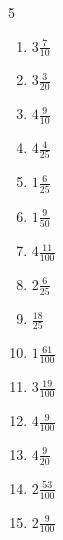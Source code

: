 \documentclass[12pt]{article}
\begin{document}
\begin{multicols}{5}
\begin{enumerate}
		\item $ 3 \frac{7}{10} $
		\item $ 3 \frac{3}{20} $
		\item $ 4 \frac{9}{10} $
		\item $ 4 \frac{4}{25} $
		\item $ 1 \frac{6}{25} $
		\item $ 1 \frac{9}{50} $
		\item $ 4 \frac{11}{100} $
		\item $ 2 \frac{6}{25} $
		\item $ \frac{18}{25} $
		\item $ 1 \frac{61}{100} $
		\item $ 3 \frac{19}{100} $
		\item $ 4 \frac{9}{100} $
		\item $ 4 \frac{9}{20} $
		\item $ 2 \frac{53}{100} $
		\item $ 2 \frac{9}{100} $
	\end{enumerate}\end{multicols}\newpage
\end{document}
